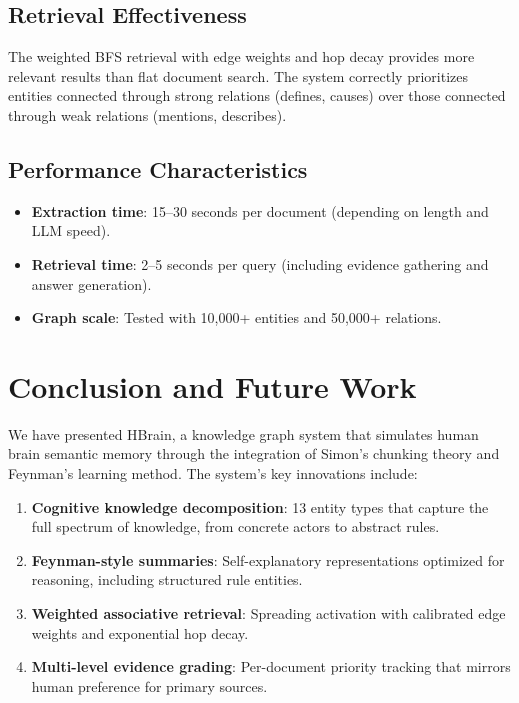 \documentclass[11pt]{article}
\begin{document}
\subsection{Retrieval Effectiveness}

The weighted BFS retrieval with edge weights and hop decay provides more relevant results than flat document search. The system correctly prioritizes entities connected through strong relations (defines, causes) over those connected through weak relations (mentions, describes).

\subsection{Performance Characteristics}

\begin{itemize}
    \item \textbf{Extraction time}: 15--30 seconds per document (depending on length and LLM speed).
    \item \textbf{Retrieval time}: 2--5 seconds per query (including evidence gathering and answer generation).
    \item \textbf{Graph scale}: Tested with 10,000+ entities and 50,000+ relations.
\end{itemize}

\section{Conclusion and Future Work}
\label{sec:conclusion}

We have presented HBrain, a knowledge graph system that simulates human brain semantic memory through the integration of Simon's chunking theory and Feynman's learning method. The system's key innovations include:

\begin{enumerate}
    \item \textbf{Cognitive knowledge decomposition}: 13 entity types that capture the full spectrum of knowledge, from concrete actors to abstract rules.
    \item \textbf{Feynman-style summaries}: Self-explanatory representations optimized for reasoning, including structured rule entities.
    \item \textbf{Weighted associative retrieval}: Spreading activation with calibrated edge weights and exponential hop decay.
    \item \textbf{Multi-level evidence grading}: Per-document priority tracking that mirrors human preference for primary sources.
\end{enumerate}
\end{document}
